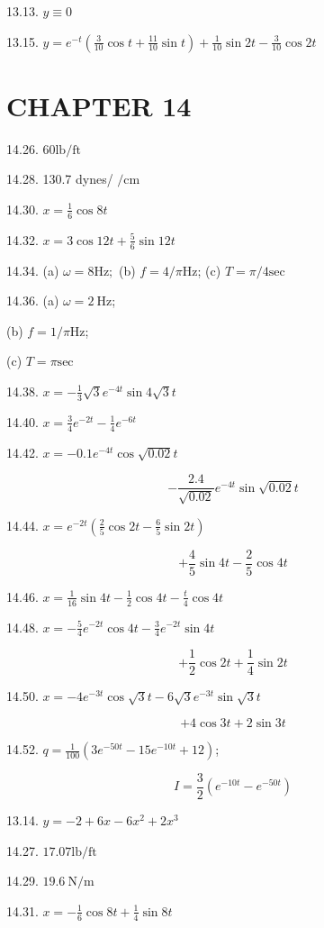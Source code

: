\documentclass[10pt]{article}
\begin{document}
13.13. $y \equiv 0$

13.15. $y=e^{-t}\left(\frac{3}{10} \cos t+\frac{11}{10} \sin t\right)+\frac{1}{10} \sin 2 t-\frac{3}{10} \cos 2 t$

\section*{CHAPTER 14}
14.26. $60 \mathrm{lb} / \mathrm{ft}$

14.28. 130.7 dynes/ $/ \mathrm{cm}$

14.30. $x=\frac{1}{6} \cos 8 t$

14.32. $x=3 \cos 12 t+\frac{5}{6} \sin 12 t$

14.34. (a) $\omega=8 \mathrm{Hz;}$ (b) $f=4 / \pi \mathrm{Hz}$; (c) $T=\pi / 4 \mathrm{sec}$

14.36. (a) $\omega=2 \mathrm{~Hz}$;

(b) $f=1 / \pi \mathrm{Hz}$;

(c) $T=\pi \mathrm{sec}$

14.38. $x=-\frac{1}{3} \sqrt{3} e^{-4 t} \sin 4 \sqrt{3} t$

14.40. $x=\frac{3}{4} e^{-2 t}-\frac{1}{4} e^{-6 t}$

14.42. $x=-0.1 e^{-4 t} \cos \sqrt{0.02} t$

$$
-\frac{2.4}{\sqrt{0.02}} e^{-4 t} \sin \sqrt{0.02} t
$$

14.44. $x=e^{-2 t}\left(\frac{2}{5} \cos 2 t-\frac{6}{5} \sin 2 t\right)$

$$
+\frac{4}{5} \sin 4 t-\frac{2}{5} \cos 4 t
$$

14.46. $x=\frac{1}{16} \sin 4 t-\frac{1}{2} \cos 4 t-\frac{t}{4} \cos 4 t$

14.48. $x=-\frac{5}{4} e^{-2 t} \cos 4 t-\frac{3}{4} e^{-2 t} \sin 4 t$

$$
+\frac{1}{2} \cos 2 t+\frac{1}{4} \sin 2 t
$$

14.50. $x=-4 e^{-3 t} \cos \sqrt{3} t-6 \sqrt{3} e^{-3 t} \sin \sqrt{3} t$

$$
+4 \cos 3 t+2 \sin 3 t
$$

14.52. $q=\frac{1}{100}\left(3 e^{-50 t}-15 e^{-10 t}+12\right)$;

$$
I=\frac{3}{2}\left(e^{-10 t}-e^{-50 t}\right)
$$

13.14. $y=-2+6 x-6 x^{2}+2 x^{3}$

14.27. $17.07 \mathrm{lb} / \mathrm{ft}$

14.29. $19.6 \mathrm{~N} / \mathrm{m}$

14.31. $x=-\frac{1}{6} \cos 8 t+\frac{1}{4} \sin 8 t$
\end{document}
